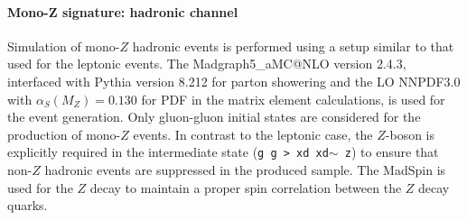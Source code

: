 \paragraph{Mono-Z signature: hadronic channel}

Simulation of mono-$Z$ hadronic events is performed using a setup similar to that used for the leptonic events. 
The Madgraph5\_aMC@NLO version 2.4.3, interfaced with Pythia version 8.212 for parton showering 
and the LO NNPDF3.0 with $\alpha_{S}(M_{Z}) = 0.130$ for PDF in the matrix element calculations, 
is used for the event generation. 
Only gluon-gluon initial states are considered for the production of mono-$Z$ events. 
In contrast to the leptonic case, the $Z$-boson is explicitly required in the intermediate state ({\tt g g > xd xd$\sim$ z}) 
to ensure that non-$Z$ hadronic events are suppressed in the produced sample. 
The MadSpin is used for the $Z$ decay to maintain a proper spin correlation between the $Z$ decay quarks.

